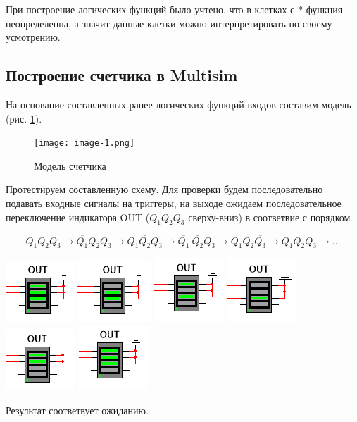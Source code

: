 При построение логических функций было учтено, что в клетках с $*$ функция неопределенна,
а значит данные клетки можно интерпретировать по своему усмотрению. \par

\subsection*{Построение счетчика в Multisim}

На основание составленных ранее логических функций входов составим модель (рис. \ref{image:1}).

\begin{figure}[h]
    \centering
    \texttt{[image: image-1.png]}
    \caption{Модель счетчика}
    \label{image:1}
\end{figure}

Протестируем составленную схему. Для проверки будем последовательно подавать входные сигналы на триггеры,
на выходе ожидаем последовательное переключение индикатора OUT ($Q_1Q_2Q_3$ сверху-вниз) в соответвие с порядком

$$
    Q_1 Q_2 Q_3 \rightarrow
    \overline{Q_1} Q_2 Q_3 \rightarrow
    Q_1 \overline{Q_2} Q_3 \rightarrow
    \overline{Q_1} \ \overline{Q_2} Q_3 \rightarrow
    Q_1 Q_2 \overline{Q_3} \rightarrow
    Q_1 Q_2 Q_3 \rightarrow \dots
$$


\begin{center}
    \includegraphics[width=.1\textwidth]{images/image-2.png}\hfill
    \includegraphics[width=.1\textwidth]{images/image-3.png}\hfill
    \includegraphics[width=.1\textwidth]{images/image-4.png}\hfill
    \includegraphics[width=.1\textwidth]{images/image-5.png}\hfill
    \includegraphics[width=.1\textwidth]{images/image-6.png}\hfill
    \includegraphics[width=.1\textwidth]{images/image-7.png}
\end{center}

Результат соответвует ожиданию.